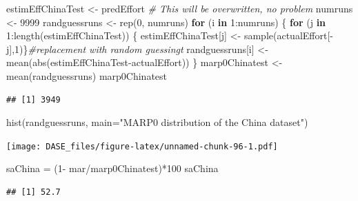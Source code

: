 \documentclass[
]{book}
\newenvironment{Shaded}{\begin{snugshade}}{\end{snugshade}}
\newcommand{\AttributeTok}[1]{\textcolor[rgb]{0.77,0.63,0.00}{#1}}
\newcommand{\CommentTok}[1]{\textcolor[rgb]{0.56,0.35,0.01}{\textit{#1}}}
\newcommand{\ControlFlowTok}[1]{\textcolor[rgb]{0.13,0.29,0.53}{\textbf{#1}}}
\newcommand{\DecValTok}[1]{\textcolor[rgb]{0.00,0.00,0.81}{#1}}
\newcommand{\FunctionTok}[1]{\textcolor[rgb]{0.00,0.00,0.00}{#1}}
\newcommand{\NormalTok}[1]{#1}
\newcommand{\OtherTok}[1]{\textcolor[rgb]{0.56,0.35,0.01}{#1}}
\newcommand{\SpecialCharTok}[1]{\textcolor[rgb]{0.00,0.00,0.00}{#1}}
\newcommand{\StringTok}[1]{\textcolor[rgb]{0.31,0.60,0.02}{#1}}
\begin{document}
\begin{Shaded}
\begin{Highlighting}[]
\NormalTok{estimEffChinaTest }\OtherTok{\textless{}{-}}\NormalTok{ predEffort  }\CommentTok{\# This will be overwritten, no problem}
\NormalTok{numruns }\OtherTok{\textless{}{-}} \DecValTok{9999}
\NormalTok{randguessruns }\OtherTok{\textless{}{-}} \FunctionTok{rep}\NormalTok{(}\DecValTok{0}\NormalTok{, numruns)}
\ControlFlowTok{for}\NormalTok{ (i }\ControlFlowTok{in} \DecValTok{1}\SpecialCharTok{:}\NormalTok{numruns) \{ }
  \ControlFlowTok{for}\NormalTok{ (j }\ControlFlowTok{in} \DecValTok{1}\SpecialCharTok{:}\FunctionTok{length}\NormalTok{(estimEffChinaTest)) \{}
\NormalTok{    estimEffChinaTest[j] }\OtherTok{\textless{}{-}} \FunctionTok{sample}\NormalTok{(actualEffort[}\SpecialCharTok{{-}}\NormalTok{j],}\DecValTok{1}\NormalTok{)\}}\CommentTok{\#replacement with random guessingt    }
\NormalTok{  randguessruns[i] }\OtherTok{\textless{}{-}} \FunctionTok{mean}\NormalTok{(}\FunctionTok{abs}\NormalTok{(estimEffChinaTest}\SpecialCharTok{{-}}\NormalTok{actualEffort))}
\NormalTok{  \} }
\NormalTok{marp0Chinatest }\OtherTok{\textless{}{-}} \FunctionTok{mean}\NormalTok{(randguessruns)}
\NormalTok{marp0Chinatest}
\end{Highlighting}
\end{Shaded}

\begin{verbatim}
## [1] 3949
\end{verbatim}

\begin{Shaded}
\begin{Highlighting}[]
\FunctionTok{hist}\NormalTok{(randguessruns, }\AttributeTok{main=}\StringTok{"MARP0 distribution of the China dataset"}\NormalTok{)}
\end{Highlighting}
\end{Shaded}

\texttt{[image: DASE\_files/figure-latex/unnamed-chunk-96-1.pdf]}

\begin{Shaded}
\begin{Highlighting}[]
\NormalTok{saChina }\OtherTok{=}\NormalTok{ (}\DecValTok{1}\SpecialCharTok{{-}}\NormalTok{ mar}\SpecialCharTok{/}\NormalTok{marp0Chinatest)}\SpecialCharTok{*}\DecValTok{100}
\NormalTok{saChina}
\end{Highlighting}
\end{Shaded}

\begin{verbatim}
## [1] 52.7
\end{verbatim}
\end{document}
